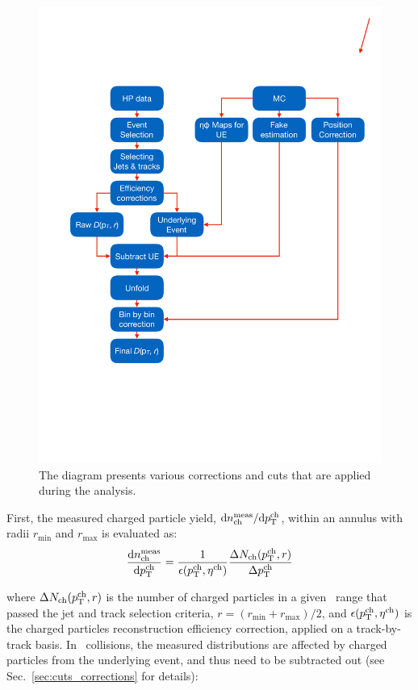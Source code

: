 \begin{figure}
\centerline{
\includegraphics[width=20.cm]{figures/main/general/Shape_analyses_flow.pdf}}
\caption{The diagram presents various corrections and cuts that are applied during the analysis.}
\label{Fig:analysis_flow}
\end{figure}

First, the measured charged particle yield, $\text{d}n^{\text{meas}}_{\text{ch}}/\text{d}\mbox{$p_{{\mathrm{T}}}^{\mathrm{ch}}$}$, within an annulus with radii $r_{\text{min}}$ and $r_{\text{max}}$ is evaluated as:
\begin{equation}
\frac{\text{d}n^{\text{meas}}_{\text{ch}}}{\text{d}\mbox{$p_{{\mathrm{T}}}^{\mathrm{ch}}$}} = \frac{1}{\epsilon(\mbox{$p_{\mathrm{T}}^{\mathrm{ch}}$}, \mbox{$\eta^{\mathrm{ch}}$})} \frac{\Delta N_{\text{ch}} (\mbox{$p_{{\mathrm{T}}}^{\mathrm{ch}}$}, r)}{\Delta \mbox{$p_{{\mathrm{T}}}^{\mathrm{ch}}$}}
\end{equation}

where $\Delta N_{\text{ch}} (\mbox{$p_{{\mathrm{T}}}^{\mathrm{ch}}$}, r)$ is the number of charged particles in a given \pTch\ range that passed the jet and track selection criteria, $r = (r_{\text{min}} + r_{\text{max}}) / 2$, and $\epsilon(\mbox{$p_{\mathrm{T}}^{\mathrm{ch}}$}, \mbox{$\eta^{\mathrm{ch}}$})$ is the charged particles reconstruction efficiency correction, applied on a track-by-track basis.
In \pbpb\ collisions, the measured distributions are affected by charged particles from the underlying event, and thus need to be subtracted out (see Sec.~\ref{sec:cuts_corrections} for details):

